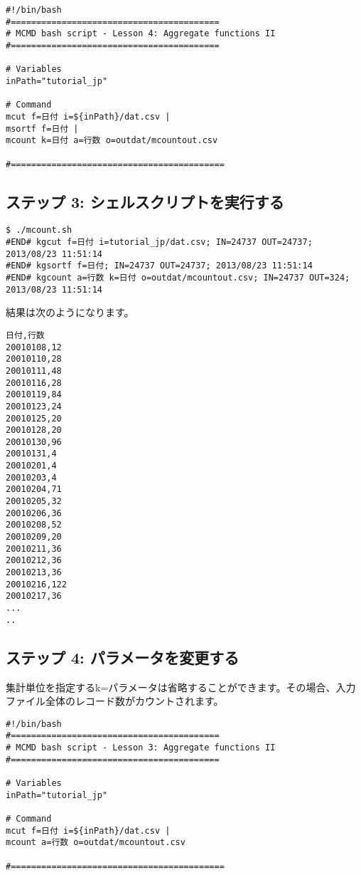 \begin{verbatim}
#!/bin/bash
#=========================================
# MCMD bash script - Lesson 4: Aggregate functions II
#=========================================

# Variables
inPath="tutorial_jp"

# Command 
mcut f=日付 i=${inPath}/dat.csv |
msortf f=日付 |   
mcount k=日付 a=行数 o=outdat/mcountout.csv

#==========================================
\end{verbatim}

\subsection{ステップ 3: シェルスクリプトを実行する}

\begin{verbatim}
$ ./mcount.sh
#END# kgcut f=日付 i=tutorial_jp/dat.csv; IN=24737 OUT=24737; 2013/08/23 11:51:14
#END# kgsortf f=日付; IN=24737 OUT=24737; 2013/08/23 11:51:14
#END# kgcount a=行数 k=日付 o=outdat/mcountout.csv; IN=24737 OUT=324; 2013/08/23 11:51:14
\end{verbatim}

\noindent
結果は次のようになります。

\begin{verbatim}
日付,行数
20010108,12
20010110,28
20010111,48
20010116,28
20010119,84
20010123,24
20010125,20
20010128,20
20010130,96
20010131,4
20010201,4
20010203,4
20010204,71
20010205,32
20010206,36
20010208,52
20010209,20
20010211,36
20010212,36
20010213,36
20010216,122
20010217,36
...
..
\end{verbatim}

\subsection{ステップ 4: パラメータを変更する}

\noindent
集計単位を指定するk=パラメータは省略することができます。その場合、入力ファイル全体のレコード数がカウントされます。

\begin{verbatim}
#!/bin/bash
#=========================================
# MCMD bash script - Lesson 3: Aggregate functions II
#=========================================

# Variables
inPath="tutorial_jp"

# Command 
mcut f=日付 i=${inPath}/dat.csv |
mcount a=行数 o=outdat/mcountout.csv

#==========================================
\end{verbatim}


